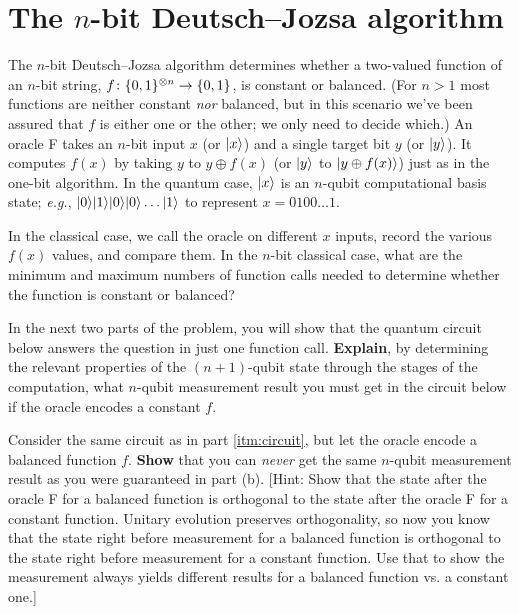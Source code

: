 \documentclass{../phys084}
\author{}
\date{2020 February 12}
\begin{document}
\section{The \(n\)-bit Deutsch--Jozsa algorithm}

\begin{exercise}
  The \(n\)-bit Deutsch--Jozsa algorithm determines whether a
  two-valued function of an \(n\)-bit string,
  \(f \colon \{0, 1\}^{\otimes n} \to \{0, 1\}\), is constant or
  balanced.  (For \(n > 1\) most functions are neither constant
  \textit{nor} balanced, but in this scenario we've been assured that
  \(f\) is either one or the other; we only need to decide which.)  An
  oracle F takes an \(n\)-bit input \(x\) (or \(\lvert x\rangle\)) and a single
  target bit \(y\) (or \(\lvert y\rangle\)).  It computes \(f(x)\) by taking
  \(y\) to \(y \oplus f(x)\) (or \(\lvert y\rangle\) to
  \(\lvert y \oplus f(x)\rangle\)) just as in the one-bit algorithm.  In the
  quantum case, \(\lvert x\rangle\) is an \(n\)-qubit computational basis
  state; \textit{e.g.}, \(\lvert0\rangle \lvert1\rangle \lvert0\rangle \lvert0\rangle \dots \lvert1\rangle\)
  to represent \(x = 0100 \dots 1\).

  \begin{problems}
  \item In the classical case, we call the oracle on different \(x\)
    inputs, record the various \(f(x)\) values, and compare them.  In
    the \(n\)-bit classical case, what are the minimum and maximum
    numbers of function calls needed to determine whether the function
    is constant or balanced?

  \item In the next two parts of the problem, you will show that the
    quantum circuit below answers the question in just one function
    call.  \textbf{Explain}, by determining the relevant properties of
    the \((n+1)\)-qubit state through the stages of the computation,
    what \(n\)-qubit measurement result you must get in the circuit
    below if the oracle encodes a constant \(f\).  \label{itm:circuit}


  \item Consider the same circuit as in part \ref{itm:circuit}, but
    let the oracle encode a balanced function \(f\).  \textbf{Show}
    that you can \textit{never} get the same \(n\)-qubit measurement
    result as you were guaranteed in part (b).  [Hint: Show that the
    state after the oracle F for a balanced function is orthogonal to
    the state after the oracle F for a constant function.  Unitary
    evolution preserves orthogonality, so now you know that the state
    right before measurement for a balanced function is orthogonal to
    the state right before measurement for a constant function.  Use
    that to show the measurement always yields different results for a
    balanced function vs. a constant one.]


\end{problems}
\end{exercise}
\end{document}
